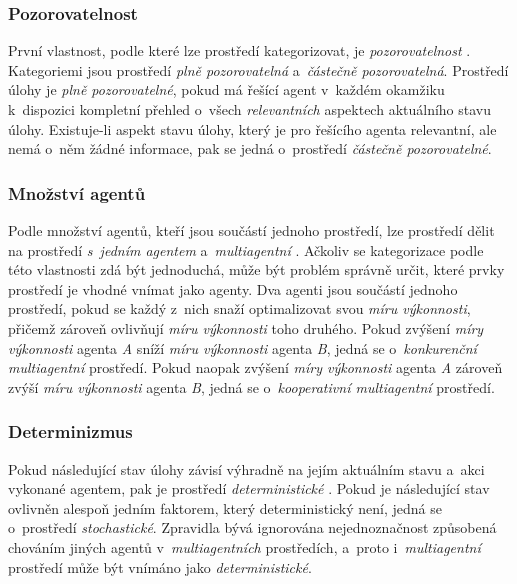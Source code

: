 \subsubsection*{Pozorovatelnost}

První vlastnost, podle které lze prostředí kategorizovat, je \emph{pozorovatelnost} \cite{AI_Russel_Norvig}. Kategoriemi jsou prostředí \emph{plně pozorovatelná} a~\emph{částečně pozorovatelná}. Prostředí úlohy je \emph{plně pozorovatelné}, pokud má řešící agent v~každém okamžiku k~dispozici kompletní přehled o~všech \emph{relevantních} aspektech aktuálního stavu úlohy. Existuje-li aspekt stavu úlohy, který je pro řešícího agenta relevantní, ale nemá o~něm žádné informace, pak se jedná o~prostředí \emph{částečně pozorovatelné}.

\subsubsection*{Množství agentů}

Podle množství agentů, kteří jsou součástí jednoho prostředí, lze prostředí dělit na prostředí \emph{s~jedním agentem} a~\emph{multiagentní} \cite{AI_Russel_Norvig}. Ačkoliv se kategorizace podle této vlastnosti zdá být jednoduchá, může být problém správně určit, které prvky prostředí je vhodné vnímat jako agenty. Dva agenti jsou součástí jednoho prostředí, pokud se každý z~nich snaží optimalizovat svou \emph{míru výkonnosti}, přičemž zároveň ovlivňují \emph{míru výkonnosti} toho druhého. Pokud zvýšení \emph{míry výkonnosti} agenta \emph{A} sníží \emph{míru výkonnosti} agenta \emph{B}, jedná se o~\emph{konkurenční multiagentní} prostředí. Pokud naopak zvýšení \emph{míry výkonnosti} agenta \emph{A} zároveň zvýší \emph{míru výkonnosti} agenta \emph{B}, jedná se o~\emph{kooperativní multiagentní} prostředí.

\subsubsection*{Determinizmus}

Pokud následující stav úlohy závisí výhradně na jejím aktuálním stavu a~akci vykonané agentem, pak je prostředí \emph{deterministické} \cite{AI_Russel_Norvig}. Pokud je následující stav ovlivněn alespoň jedním faktorem, který deterministický není, jedná se o~prostředí \emph{stochastické}. Zpravidla bývá ignorována nejednoznačnost způsobená chováním jiných agentů v~\emph{multiagentních} prostředích, a~proto i~\emph{multiagentní} prostředí může být vnímáno jako \emph{deterministické}.

